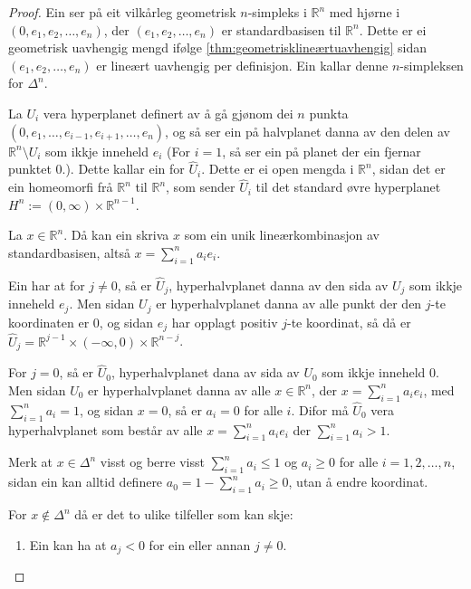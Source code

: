 \documentclass[a4paper, 12pt, norsk]{article}
\theoremstyle{plain}
\theoremstyle{definition}
\newcommand{\Rb}{\mathbb{R}}
\newcommand{\tuple}[1]{ \left( #1 \right) } %
\begin{document}
\begin{proof}
	Ein ser på eit vilkårleg geometrisk \( n \)-simpleks i \( \Rb^n \) med hjørne i \( \tuple{0, e_1, e_2, \dots, e_n} \), der \( \tuple{e_1, e_2, \dots, e_n} \) er standardbasisen til \( \Rb^n \). Dette er ei geometrisk uavhengig mengd ifølge \autoref{thm:geometrisklineærtuavhengig} sidan \( \tuple{e_1, e_2, \dots, e_n} \) er lineært uavhengig per definisjon. Ein kallar denne \( n \)-simpleksen for \( \Delta^n \).

	La \( U_i \) vera hyperplanet definert av å gå gjønom dei \( n \) punkta \( \tuple{0, e_1, \dots, e_{i-1}, e_{i+1}, \dots, e_n} \), og så ser ein på halvplanet danna av den delen av \( \Rb^n \setminus U_i \) som ikkje inneheld \( e_i \) (For \( i=1 \), så ser ein på planet der ein fjernar punktet \( 0 \).). Dette kallar ein for \( \hat{U}_i \). Dette er ei open mengda i \( \Rb^n \), sidan det er ein homeomorfi frå \( \Rb^n \) til \( \Rb^n \), som sender \( \hat{U}_i \) til det standard øvre hyperplanet \( H^n := (0, \infty) \times \Rb^{n-1} \).

	La \( x \in \Rb^n \). Då kan ein skriva \( x \) som ein unik lineærkombinasjon av standardbasisen, altså \( x = \sum_{i=1}^n a_ie_i \). 

	Ein har at for \( j \neq 0 \), så er \( \hat{U}_j \), hyperhalvplanet danna av den sida av \( U_j \) som ikkje inneheld \( e_j \). Men sidan \( U_j \) er hyperhalvplanet danna av alle punkt der den \( j \)-te koordinaten er \( 0 \), og sidan \( e_j \) har opplagt positiv \( j \)-te koordinat, så då er \( \hat{U}_j = \Rb^{j-1}\times(-\infty, 0) \times \Rb^{n-j} \).

	For \( j = 0 \), så er \( \hat{U}_0 \), hyperhalvplanet dana av sida av \( U_0 \) som ikkje inneheld \( 0 \). Men sidan \( U_0 \) er hyperhalvplanet danna av alle \( x \in \Rb^n \),  der \( x = \sum_{i = 1}^n a_i e_i \), med \( \sum_{i = 1}^n a_i = 1 \), og sidan \( x = 0 \), så er \( a_i = 0 \) for alle \( i \). Difor må \( \hat{U}_0 \) vera hyperhalvplanet som består av alle \( x = \sum_{i = 1}^n a_i e_i \) der \( \sum_{i = 1}^n a_i > 1 \).

	Merk at \( x \in \Delta^n \) visst og berre visst \( \sum_{i=1}^n a_i \leq 1 \) og \( a_i \geq 0 \) for alle \( i = 1, 2, \dots, n \), sidan ein kan alltid definere \( a_0 = 1 - \sum_{i=1}^n a_i \geq 0 \), utan å endre koordinat.

	For \( x \not\in \Delta^n \) då er det to ulike tilfeller som kan skje:

	\begin{enumerate}
		\item { Ein kan ha at \( a_j < 0 \) for ein eller annan \( j \neq 0 \).
		
}
\end{enumerate}
\end{proof}
\end{document}
